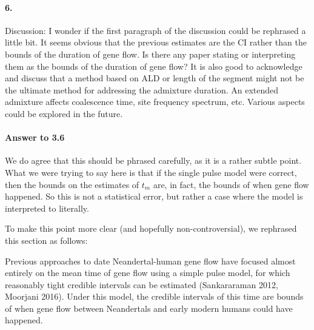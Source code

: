 \documentclass[11pt]{article}
\let\oldparagraph\paragraph
\renewcommand{\paragraph}[1]{\oldparagraph{#1}\mbox{}}
\begin{document}
\paragraph{6.} 
Discussion: I wonder if the first paragraph of the discussion could be rephrased a little bit. It seems obvious that the previous estimates are the CI rather than the bounds of the duration of gene flow. Is there any paper stating or interpreting them as the bounds of the duration of gene flow? It is also good to acknowledge and discuss that a method based on ALD or length of the segment might not be the ultimate method for addressing the admixture duration. An extended admixture affects coalescence time, site frequency spectrum, etc. Various aspects could be explored in the future.

\paragraph{Answer to 3.6}
We do agree that this should be phrased carefully, as it is a rather subtle point. What we were trying to say here is that if the single pulse model were correct, then the bounds on the estimates of $t_m$ are, in fact,  the bounds of when gene flow happened. So this is not a statistical error, but rather a case where the model is interpreted to literally. 


To make this point more clear (and hopefully non-controversial), we rephrased this section as follows:

\begin{mdframed}[hidealllines=true,backgroundcolor=grey!20]
Previous approaches to date Neandertal-human gene flow have focused almost entirely on the mean time of gene flow using a simple pulse model, for which reasonably tight credible intervals can be estimated (Sankararaman 2012, Moorjani 2016). Under this model, the credible intervals of this time are bounds of when gene flow between Neandertals and early modern humans could have happened. 
\end{mdframed}
\end{document}

